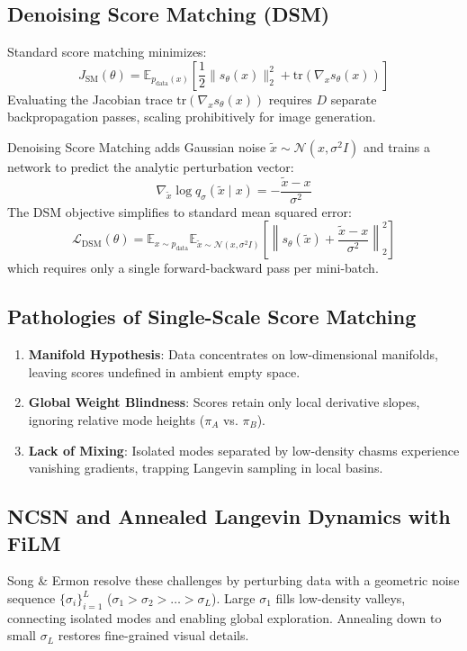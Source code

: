 \documentclass[10pt,journal,compsoc]{IEEEtran}
\begin{document}
\subsection{Denoising Score Matching (DSM)}
Standard score matching minimizes:
\begin{equation}
J_{\text{SM}}(\theta) = \mathbb{E}_{p_{\text{data}}(x)} \left[ \frac{1}{2} \|s_\theta(x)\|_2^2 + \text{tr}(\nabla_x s_\theta(x)) \right]
\end{equation}
Evaluating the Jacobian trace $\text{tr}(\nabla_x s_\theta(x))$ requires $D$ separate backpropagation passes, scaling prohibitively for image generation.

Denoising Score Matching adds Gaussian noise $\tilde{x} \sim \mathcal{N}(x, \sigma^2 I)$ and trains a network to predict the analytic perturbation vector:
\begin{equation}
\nabla_{\tilde{x}} \log q_\sigma(\tilde{x} \mid x) = -\frac{\tilde{x} - x}{\sigma^2}
\end{equation}
The DSM objective simplifies to standard mean squared error:
\begin{equation}
\mathcal{L}_{\text{DSM}}(\theta) = \mathbb{E}_{x \sim p_{\text{data}}} \mathbb{E}_{\tilde{x} \sim \mathcal{N}(x, \sigma^2 I)} \left[ \left\| s_\theta(\tilde{x}) + \frac{\tilde{x} - x}{\sigma^2} \right\|_2^2 \right]
\end{equation}
which requires only a single forward-backward pass per mini-batch.

\subsection{Pathologies of Single-Scale Score Matching}
\begin{enumerate}
    \item \textbf{Manifold Hypothesis}: Data concentrates on low-dimensional manifolds, leaving scores undefined in ambient empty space.
    \item \textbf{Global Weight Blindness}: Scores retain only local derivative slopes, ignoring relative mode heights ($\pi_A$ vs. $\pi_B$).
    \item \textbf{Lack of Mixing}: Isolated modes separated by low-density chasms experience vanishing gradients, trapping Langevin sampling in local basins.
\end{enumerate}

\subsection{NCSN and Annealed Langevin Dynamics with FiLM}
Song \& Ermon resolve these challenges by perturbing data with a geometric noise sequence $\{\sigma_i\}_{i=1}^L$ ($\sigma_1 > \sigma_2 > \dots > \sigma_L$). Large $\sigma_1$ fills low-density valleys, connecting isolated modes and enabling global exploration. Annealing down to small $\sigma_L$ restores fine-grained visual details.
\end{document}
